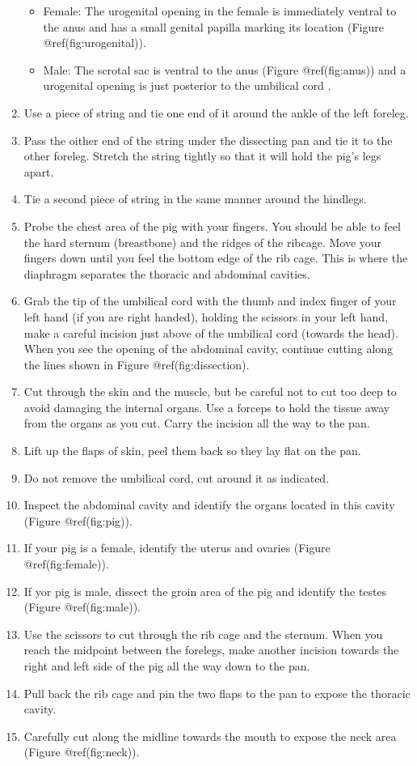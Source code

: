 \begin{enumerate}
  \begin{itemize}
  \tightlist
  \item
    Female: The urogenital opening in the female is immediately ventral to the anus and has a small genital papilla marking its location (Figure @ref(fig:urogenital)).
  \item
    Male: The scrotal sac is ventral to the anus (Figure @ref(fig:anus)) and a urogenital opening is just posterior to the umbilical cord .
  \end{itemize}
\item
  Use a piece of string and tie one end of it around the ankle of the left foreleg.
\item
  Pass the oither end of the string under the dissecting pan and tie it to the other foreleg. Stretch the string tightly so that it will hold the pig's legs apart.
\item
  Tie a second piece of string in the same manner around the hindlegs.
\item
  Probe the chest area of the pig with your fingers. You should be able to feel the hard sternum (breastbone) and the ridges of the ribcage. Move your fingers down until you feel the bottom edge of the rib cage. This is where the diaphragm separates the thoracic and abdominal cavities.
\item
  Grab the tip of the umbilical cord with the thumb and index finger of your left hand (if you are right handed), holding the scissors in your left hand, make a careful incision just above of the umbilical cord (towards the head). When you see the opening of the abdominal cavity, continue cutting along the lines shown in Figure @ref(fig:dissection).
\item
  Cut through the skin and the muscle, but be careful not to cut too deep to avoid damaging the internal organs. Use a forceps to hold the tissue away from the organs as you cut. Carry the incision all the way to the pan.
\item
  Lift up the flaps of skin, peel them back so they lay flat on the pan.
\item
  Do not remove the umbilical cord, cut around it as indicated.
\item
  Inspect the abdominal cavity and identify the organs located in this cavity (Figure @ref(fig:pig)).
\item
  If your pig is a female, identify the uterus and ovaries (Figure @ref(fig:female)).
\item
  If yor pig is male, dissect the groin area of the pig and identify the testes (Figure @ref(fig:male)).
\item
  Use the scissors to cut through the rib cage and the sternum. When you reach the midpoint between the forelegs, make another incision towards the right and left side of the pig all the way down to the pan.
\item
  Pull back the rib cage and pin the two flaps to the pan to expose the thoracic cavity.
\item
  Carefully cut along the midline towards the mouth to expose the neck area (Figure @ref(fig:neck)).
\end{enumerate}

